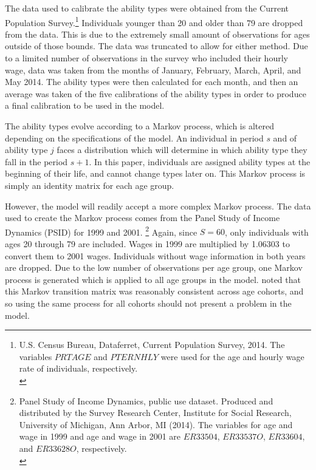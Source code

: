 \documentclass[letterpaper,12pt]{article}
\theoremstyle{definition}
\begin{document}
  The data used to calibrate the ability types were obtained from the Current Population Survey.\footnote{U.S. Census Bureau, Dataferret, Current Population Survey, 2014. The variables $PRTAGE$ and $PTERNHLY$ were used for the age and hourly wage rate of individuals, respectively. \\ [-2pt]} Individuals younger than 20 and older than 79 are dropped from the data. This is due to the extremely small amount of observations for ages outside of those bounds. The data was truncated to allow for either method. Due to a limited number of observations in the survey who included their hourly wage, data was taken from the months of January, February, March, April, and May 2014.  The ability types were then calculated for each month, and then an average was taken of the five calibrations of the ability types in order to produce a final calibration to be used in the model.

  The ability types evolve according to a Markov process, which is altered depending on the specifications of the model.  An individual in period $s$ and of ability type $j$ faces a distribution which will determine in which ability type they fall in the period $s+1$.  In this paper, individuals are assigned ability types at the beginning of their life, and cannot change types later on.  This Markov process is simply an identity matrix for each age group.

  However, the model will readily accept a more complex Markov process.  The data used to create the Markov process comes from the Panel Study of Income Dynamics (PSID) for 1999 and 2001. \footnote{Panel Study of Income Dynamics, public use dataset. Produced and distributed by the Survey Research Center, Institute for Social Research, University of Michigan, Ann Arbor, MI (2014). The variables for age and wage in 1999 and age and wage in 2001 are $ER33504$, $ER33537O$, $ER33604$, and $ER33628O$, respectively.\\ [-2pt]} Again, since $S=60$, only individuals with ages 20 through 79 are included.  Wages in 1999 are multiplied by 1.06303 to convert them to 2001 wages. Individuals without wage information in both years are dropped. Due to the low number of observations per age group, one Markov process is generated which is applied to all age groups in the model. \cite{Nishiyama:2003} noted that this Markov transition matrix was reasonably consistent across age cohorts, and so using the same process for all cohorts should not present a problem in the model.
\end{document}
